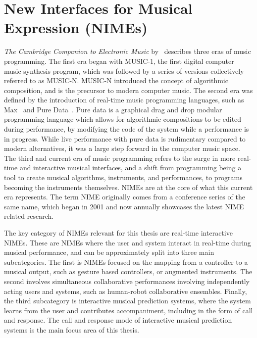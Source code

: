 \section{New Interfaces for Musical Expression (NIMEs)}
\textit{The Cambridge Companion to Electronic Music} by~\cite{Collins2012Cambridge} describes three eras of music programming. The first era began with MUSIC-1, the first digital computer music synthesis program, which was followed by a series of versions collectively referred to as MUSIC-N. MUSIC-N introduced the concept of algorithmic composition, and is the precursor to modern computer music. The second era was defined by the introduction of real-time music programming languages, such as Max~\citep{Puckette2002Max} and Pure Data~\citep{Puckette1997PD}. Pure data is a graphical drag and drop modular programming language which allows for algorithmic compositions to be edited during performance, by modifying the code of the system while a performance is in progress. While live performance with pure data is rudimentary compared to modern alternatives, it was a large step forward in the computer music space. The third and current era of music programming refers to the surge in more real-time and interactive musical interfaces, and a shift from programming being a tool to create musical algorithms, instruments, and performances, to programs becoming the instruments themselves. NIMEs are at the core of what this current era represents. The term NIME originally comes from a conference series of the same name, which began in 2001 and now annually showcases the latest NIME related research.

The key category of NIMEs relevant for this thesis are real-time interactive NIMEs. These are NIMEs where the user and system interact in real-time during musical performance, and can be approximately split into three main subcategories. The first is NIMEs focused on the mapping from a controller to a musical output, such as gesture based controllers, or augmented instruments. The second involves simultaneous collaborative performances involving independently acting users and systems, such as human-robot collaborative ensembles. Finally, the third subcategory is interactive musical prediction systems, where the system learns from the user and contributes accompaniment, including in the form of call and response. The call and response mode of interactive musical prediction systems is the main focus area of this thesis.


